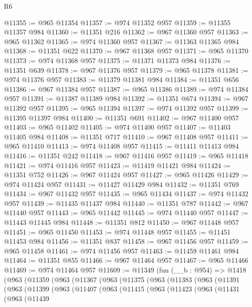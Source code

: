\begin{lexlean}{R6}
\begin{coremodule}
@11355 := @965 @11354
@11357 := @974 @11352 @957
@11359 := @11355 @11357 @984
@11360 := @11351 @216
@11362 := @967 @11360 @957
@11363 := @965 @11362
@11365 := @974 @11360 @957
@11367 := @11363 @11365 @984
@11368 := @11351 @622
@11370 := @967 @11368 @957
@11371 := @965 @11370
@11373 := @974 @11368 @957
@11375 := @11371 @11373 @984
@11376 := @11351 @639
@11378 := @967 @11376 @957
@11379 := @965 @11378
@11381 := @974 @11376 @957
@11383 := @11379 @11381 @984
@11384 := @11351 @656
@11386 := @967 @11384 @957
@11387 := @965 @11386
@11389 := @974 @11384 @957
@11391 := @11387 @11389 @984
@11392 := @11351 @674
@11394 := @967 @11392 @957
@11395 := @965 @11394
@11397 := @974 @11392 @957
@11399 := @11395 @11397 @984
@11400 := @11351 @691
@11402 := @967 @11400 @957
@11403 := @965 @11402
@11405 := @974 @11400 @957
@11407 := @11403 @11405 @984
@11408 := @11351 @717
@11410 := @967 @11408 @957
@11411 := @965 @11410
@11413 := @974 @11408 @957
@11415 := @11411 @11413 @984
@11416 := @11351 @242
@11418 := @967 @11416 @957
@11419 := @965 @11418
@11421 := @974 @11416 @957
@11423 := @11419 @11421 @984
@11424 := @11351 @752
@11426 := @967 @11424 @957
@11427 := @965 @11426
@11429 := @974 @11424 @957
@11431 := @11427 @11429 @984
@11432 := @11351 @769
@11434 := @967 @11432 @957
@11435 := @965 @11434
@11437 := @974 @11432 @957
@11439 := @11435 @11437 @984
@11440 := @11351 @787
@11442 := @967 @11440 @957
@11443 := @965 @11442
@11445 := @974 @11440 @957
@11447 := @11443 @11445 @984
@11448 := @11351 @812
@11450 := @967 @11448 @957
@11451 := @965 @11450
@11453 := @974 @11448 @957
@11455 := @11451 @11453 @984
@11456 := @11351 @837
@11458 := @967 @11456 @957
@11459 := @965 @11458
@11461 := @974 @11456 @957
@11463 := @11459 @11461 @984
@11464 := @11351 @855
@11466 := @967 @11464 @957
@11467 := @965 @11466
@11469 := @974 @11464 @957
@11609 := @11349
    (fun (__b : @954) =>
    @1418
      (@963
        (@11359
          (@963
            (@11367
              (@963
                (@11375
                  (@963
                    (@11383
                      (@963
                        (@11391
                          (@963
                            (@11399
                              (@963
                                (@11407
                                  (@963
                                    (@11415
                                      (@963
                                        (@11423
                                          (@963
                                            (@11431
                                              (@963
                                                (@11439

\end{coremodule}
\end{lexlean}
